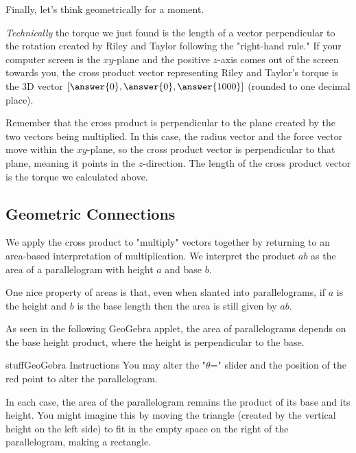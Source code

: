 \documentclass{ximera}
\begin{document}
Finally, let's think geometrically for a moment.

\begin{problem}
    \emph{Technically} the torque we just found is the length of a vector perpendicular to the rotation created by Riley and Taylor following the "right-hand rule." If your computer screen is the $xy$-plane and the positive $z$-axis comes out of the screen towards you, the cross product vector representing Riley and Taylor's torque is the 3D vector $[\answer{0},\answer{0},\answer{1000}]$ (rounded to one decimal place).

    \begin{feedback}
        Remember that the cross product is perpendicular to the plane created by the two vectors being multiplied. In this case, the radius vector and the force vector move within the $xy$-plane, so the cross product vector is perpendicular to that plane, meaning it points in the $z$-direction. The length of the cross product vector is the torque we calculated above.
    \end{feedback}
\end{problem}

\subsection*{Geometric Connections}
We apply the cross product to "multiply" vectors together by returning to an area-based interpretation of multiplication. We interpret the product $ab$ as the area of a parallelogram with height $a$ and base $b$. 

One nice property of areas is that, even when slanted into parallelograms, if $a$ is the height and $b$ is the base length then the area is still given by $ab$.

As seen in the following GeoGebra applet, the area of parallelograms depends on the base height product, where the height is perpendicular to the base. 

\begin{expandable}{stuff}{GeoGebra Instructions}
    You may alter the "$\theta$=" slider and the position of the red point to alter the parallelogram.
\end{expandable}

\begin{center}
\end{center}

In each case, the area of the parallelogram remains the product of its base and its height. You might imagine this by moving the triangle (created by the vertical height on the left side) to fit in the empty space on the right of the parallelogram, making a rectangle.
\end{document}
